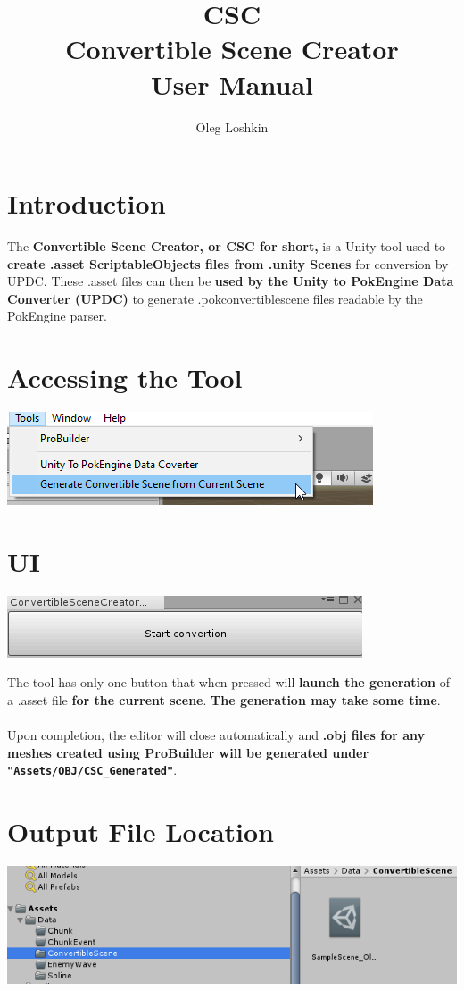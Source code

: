 \documentclass[10pt,a4paper]{article}
\author{Oleg Loshkin}
\title{\textbf{CSC}\\Convertible Scene Creator\\\textbf{User Manual}}
\begin{document}
\maketitle

\section{Introduction}
The \textbf{Convertible Scene Creator, or CSC for short,} is a Unity tool used to \textbf{create .asset ScriptableObjects files from .unity Scenes} for conversion by UPDC.
These .asset files can then be \textbf{used by the Unity to PokEngine Data Converter (UPDC)} to generate .pokconvertiblescene files readable by the PokEngine parser.

\section{Accessing the Tool}
\begin{center}
\includegraphics[scale=1.0]{mainMenu}
\end{center}

\section{UI}
\begin{center}
\includegraphics[scale=1.0]{editorUi}
\end{center}
The tool has only one button that when pressed will \textbf{launch the generation} of a .asset file \textbf{for the current scene}. \textbf{The generation may take some time}.\\\\
Upon completion, the editor will close automatically and \textbf{.obj files for any meshes created using ProBuilder will be generated under \texttt{"Assets/OBJ/CSC\_Generated"}}.

\section{Output File Location}
\begin{center}
\includegraphics[scale=0.75]{outputFile}
\end{center}
\newpage
\end{document}
